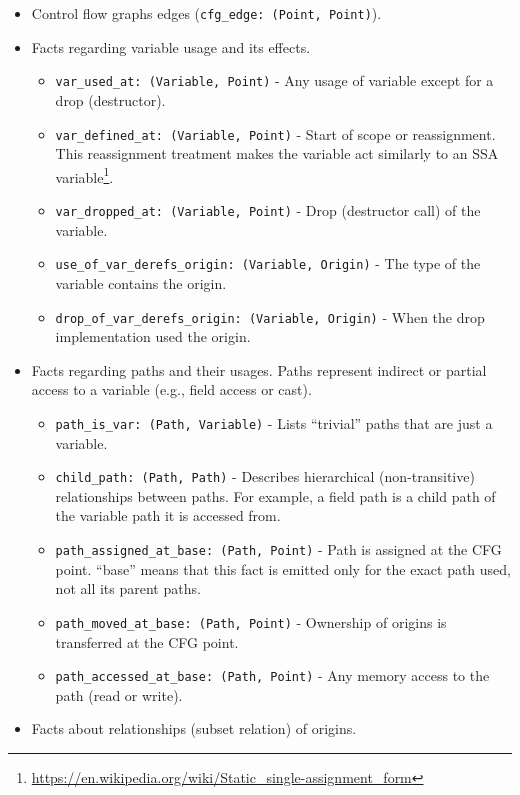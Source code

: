\documentclass[
  11pt,
]{report}
\providecommand{\tightlist}{%
  \setlength{\itemsep}{0pt}\setlength{\parskip}{0pt}}
\DeclareRobustCommand{\href}[2]{#2\footnote{\url{#1}}}
\begin{document}
\begin{itemize}
\tightlist
\item
  Control flow graphs edges (\texttt{cfg\_edge:\ (Point,\ Point)}).
\item
  Facts regarding variable usage and its effects.

  \begin{itemize}
  \tightlist
  \item
    \texttt{var\_used\_at:\ (Variable,\ Point)} - Any usage of variable
    except for a drop (destructor).
  \item
    \texttt{var\_defined\_at:\ (Variable,\ Point)} - Start of scope or
    reassignment. This reassignment treatment makes the variable act
    similarly to an
    \href{https://en.wikipedia.org/wiki/Static_single-assignment_form}{SSA
    variable}.
  \item
    \texttt{var\_dropped\_at:\ (Variable,\ Point)} - Drop (destructor
    call) of the variable.
  \item
    \texttt{use\_of\_var\_derefs\_origin:\ (Variable,\ Origin)} - The
    type of the variable contains the origin.
  \item
    \texttt{drop\_of\_var\_derefs\_origin:\ (Variable,\ Origin)} - When
    the drop implementation used the origin.
  \end{itemize}
\item
  Facts regarding paths and their usages. Paths represent indirect or
  partial access to a variable (e.g., field access or cast).

  \begin{itemize}
  \tightlist
  \item
    \texttt{path\_is\_var:\ (Path,\ Variable)} - Lists ``trivial'' paths
    that are just a variable.
  \item
    \texttt{child\_path:\ (Path,\ Path)} - Describes hierarchical
    (non-transitive) relationships between paths. For example, a field
    path is a child path of the variable path it is accessed from.
  \item
    \texttt{path\_assigned\_at\_base:\ (Path,\ Point)} - Path is
    assigned at the CFG point. ``base'' means that this fact is emitted
    only for the exact path used, not all its parent paths.
  \item
    \texttt{path\_moved\_at\_base:\ (Path,\ Point)} - Ownership of
    origins is transferred at the CFG point.
  \item
    \texttt{path\_accessed\_at\_base:\ (Path,\ Point)} - Any memory
    access to the path (read or write).
  \end{itemize}
\item
  Facts about relationships (subset relation) of origins.


\end{itemize}
\end{document}
